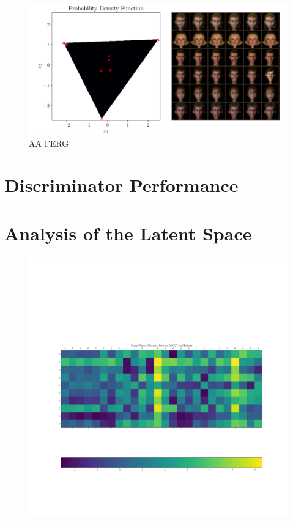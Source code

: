 \begin{figure}[htpb]
    \centering
    \includegraphics[width=1\linewidth]{figures/samples/aa_ferg3.pdf}
    \caption{AA FERG}%
    \label{fig:aa_ferg}
\end{figure}


\section{Discriminator Performance}%
\label{sec:discriminator_performance}


\section{Analysis of the Latent Space}%
\label{sec:analysis_of_the_latent_space}

\begin{figure}[htpb]
    \centering
    \includegraphics[width=0.8\linewidth]{figures/samples/emnist_distance_matrix_letters.pdf}
    \caption{}%
    \label{fig:}
\end{figure}

